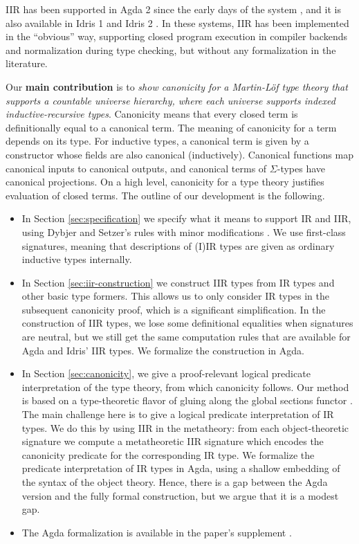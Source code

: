 \documentclass[acmsmall,screen,review]{acmart}
\begin{document}
IIR has been supported in Agda 2 since the early days of the system \cite{DBLP:conf/tphol/BoveDN09},
and it is also available in Idris 1 \cite{DBLP:journals/jfp/Brady13} and Idris 2
\cite{DBLP:conf/ecoop/Brady21}. In these systems, IIR has been implemented in the ``obvious'' way,
supporting closed program execution in compiler backends and normalization during type checking, but
without any formalization in the literature.

Our \textbf{main contribution} is to \emph{show canonicity for a Martin-Löf type theory that
supports a countable universe hierarchy, where each universe supports indexed inductive-recursive
types}. Canonicity means that every closed term is definitionally equal to a canonical term. The
meaning of canonicity for a term depends on its type. For inductive types, a canonical term is given
by a constructor whose fields are also canonical (inductively). Canonical functions map canonical
inputs to canonical outputs, and canonical terms of $\Sigma$-types have canonical projections. On a
high level, canonicity for a type theory justifies evaluation of closed terms. The outline of our
development is the following.

\begin{itemize}
\item In Section \ref{sec:specification} we specify what it means to support IR and IIR, using
  Dybjer and Setzer's rules with minor modifications \cite{DBLP:journals/jlp/DybjerS06,DBLP:journals/apal/DybjerS03}. We use
  first-class signatures, meaning that descriptions of (I)IR types are given as ordinary inductive
  types internally.
\item In Section \ref{sec:iir-construction} we construct IIR types from IR types and other basic
  type formers. This allows us to only consider IR types in the subsequent canonicity proof, which
  is a significant simplification. In the construction of IIR types, we lose some definitional
  equalities when signatures are neutral, but we still get the same computation rules that are
  available for Agda and Idris' IIR types. We formalize the construction in Agda.
\item In Section \ref{sec:canonicity}, we give a proof-relevant logical predicate interpretation of
  the type theory, from which canonicity follows. Our method is based on a type-theoretic flavor of
  gluing along the global sections functor \cite{gluing,coquand2018canonicity}. The main challenge
  here is to give a logical predicate interpretation of IR types. We do this by using IIR in the
  metatheory: from each object-theoretic signature we compute a metatheoretic IIR signature which
  encodes the canonicity predicate for the corresponding IR type.  We formalize the predicate
  interpretation of IR types in Agda, using a shallow embedding of the syntax of the object
  theory. Hence, there is a gap between the Agda version and the fully formal construction, but we
  argue that it is a modest gap.
\item
  The Agda formalization is available in the paper's supplement \cite{ir-canonicity-supplement}.
\end{itemize}
\end{document}
